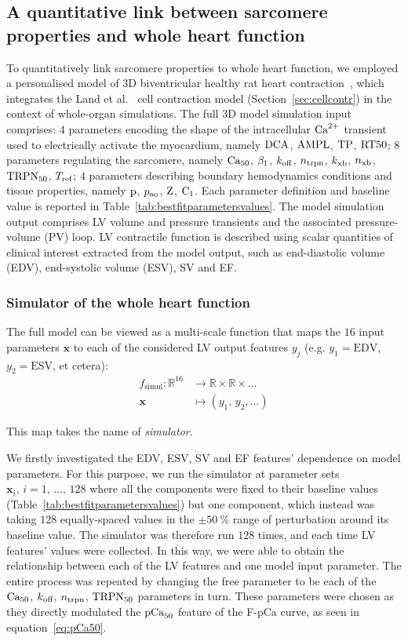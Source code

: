 \subsection{A quantitative link between sarcomere properties and whole heart function}\label{subsec:quantlink}
To quantitatively link sarcomere properties to whole heart function, we employed a personalised model of $3$D biventricular healthy rat heart contraction~\cite{Longobardi:2020}, which integrates the Land et al.~\cite{Land:2012} cell contraction model (Section~\ref{sec:cellcontr}) in the context of whole-organ simulations. The full $3$D model simulation input comprises: $4$ parameters encoding the shape of the intracellular $\textrm{Ca}^{2+}$ transient used to electrically activate the myocardium, namely $\textrm{DCA}$, $\textrm{AMPL}$, $\textrm{TP}$, $\textrm{RT50}$; $8$ parameters regulating the sarcomere, namely $\textrm{Ca}_{50}$, $\beta_1$, $k_{\textrm{off}}$, $n_{\textrm{trpn}}$, $k_{\textrm{xb}}$, $n_{\textrm{xb}}$, $\textrm{TRPN}_{50}$, $T_{\textrm{ref}}$; $4$ parameters describing boundary hemodynamics conditions and tissue properties, namely $\textrm{p}$, $p_{\textrm{ao}}$, $\textrm{Z}$, $\textrm{C}_1$. Each parameter definition and baseline value is reported in Table~\ref{tab:bestfitparametersvalues}. The model simulation output comprises LV volume and pressure transients and the associated pressure-volume (PV) loop. LV contractile function is described using scalar quantities of clinical interest extracted from the model output, such as end-diastolic volume (EDV), end-systolic volume (ESV), SV and EF.


%
%
%
\subsubsection{Simulator of the whole heart function}
The full model can be viewed as a multi-scale function that maps the $16$ input parameters $\mathbf{x}$ to each of the considered LV output features $y_j$ (e.g. $y_1=\textrm{EDV}$, $y_2=\textrm{ESV}$, et cetera):
%
\begin{align}\label{eq:fsimul}
    f_{\textrm{simul}}\colon\mathbb{R}^{16} &\to\mathbb{R}\times\mathbb{R}\times\dots \\
    \mathbf{x} &\mapsto (y_1,\,y_2,\dots) \nonumber
\end{align}

This map takes the name of \textit{simulator}.

\vspace{0.2cm}
We firstly investigated the EDV, ESV, SV and EF features' dependence on model parameters. For this purpose, we run the simulator at parameter sets $\mathbf{x}_i,\,i=1,\,\dots,\,128$ where all the components were fixed to their baseline values (Table~\ref{tab:bestfitparametersvalues}) but one component, which instead was taking $128$ equally-spaced values in the $\pm\SI{50}{\percent}$ range of perturbation around its baseline value. The simulator was therefore run $128$ times, and each time LV features' values were collected. In this way, we were able to obtain the relationship between each of the LV features and one model input parameter. The entire process was repeated by changing the free parameter to be each of the $\textrm{Ca}_{50}$, $k_{\textrm{off}}$, $n_{\textrm{trpn}}$, $\textrm{TRPN}_{50}$ parameters in turn. These parameters were chosen as they directly modulated the $\textrm{pCa}_{50}$ feature of the F-pCa curve, as seen in equation~\eqref{eq:pCa50}.


